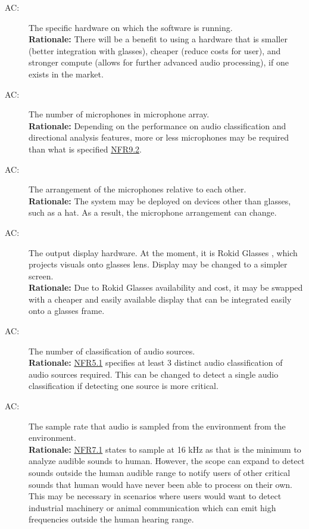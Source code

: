 \documentclass[12pt, titlepage]{article}
\newcounter{acnum}
\newcommand{\actheacnum}{AC\theacnum}
\begin{document}
\begin{description}
\item[ \actheacnum \label{acHardware}:]
  The specific hardware on which the software is running. \\
  \textbf{Rationale:} There will be a benefit to using a hardware that is
  smaller (better integration with glasses), cheaper (reduce costs for user),
  and stronger compute (allows for further advanced audio processing), if one
  exists in the market.

\item[ \actheacnum \label{acNumMic}:] 
  The number of microphones in microphone array. \\
  \textbf{Rationale:} Depending on the performance on audio classification and
  directional analysis features, more or less microphones may be required than
  what is specified \hyperref[SRS-NFR9_2]{NFR9.2}.

\item[ \actheacnum \label{acMicArrangement}:] 
  The arrangement of the microphones relative to each other. \\
  \textbf{Rationale:} The system may be deployed on devices other than glasses,
  such as a hat. As a result, the microphone arrangement can change.

\item[ \actheacnum \label{acOutput}:]
  The output display hardware. At the moment, it is Rokid Glasses
  \cite{RokidGlasses}, which projects visuals onto glasses lens. Display may be
  changed to a simpler screen. \\
  \textbf{Rationale:} Due to Rokid Glasses availability and cost, it may be
  swapped with a cheaper and easily available display that can be integrated
  easily onto a glasses frame.

\item[ \actheacnum \label{NumClassification}:]
  The number of classification of audio sources. \\
  \textbf{Rationale:} \hyperref[SRS-NFR5_1]{NFR5.1} specifies at least 3
  distinct audio classification of audio sources required. This can be changed
  to detect a single audio classification if detecting one source is more
  critical.

\item[ \actheacnum \label{SampleRate}:]
  The sample rate that audio is sampled from the environment from the
  environment. \\
  \textbf{Rationale:} \hyperref[SRS-NFR7_1]{NFR7.1} states to sample at 16 kHz
  as that is the minimum to analyze audible sounds to human. However, the scope
  can expand to detect sounds outside the human audible range to notify users of
  other critical sounds that human would have never been able to process on
  their own. This may be necessary in scenarios where users would want to detect
  industrial machinery or animal communication which can emit high frequencies
  outside the human hearing range.


\end{description}
\end{document}
